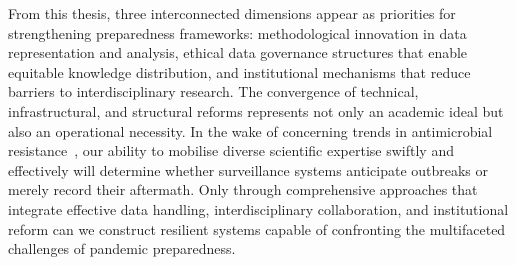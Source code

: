 From this thesis, three interconnected dimensions appear as priorities for strengthening preparedness frameworks: methodological innovation in data representation and analysis, ethical data governance structures that enable equitable knowledge distribution, and institutional mechanisms that reduce barriers to interdisciplinary research.
The convergence of technical, infrastructural, and structural reforms represents not only an academic ideal but also an operational necessity. In the wake of concerning trends in antimicrobial resistance~\cite{naghavi2025}, our ability to mobilise diverse scientific expertise swiftly and effectively will determine whether surveillance systems anticipate outbreaks or merely record their aftermath. Only through comprehensive approaches that integrate effective data handling, interdisciplinary collaboration, and institutional reform can we construct resilient systems capable of confronting the multifaceted challenges of pandemic preparedness.
